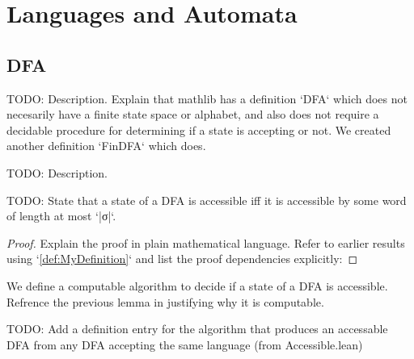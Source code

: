\chapter {Languages and Automata}

\section{DFA}


\begin{definition}
\label{def:DFA}
TODO: Description. Explain that mathlib has a definition `DFA` which does not necesarily 
have a finite state space or alphabet, and also does not require a decidable procedure for 
determining if a state is accepting or not. We created another definition `FinDFA` which does.
\leanok %
\end{definition}

\begin{definition}
\label{def:AccessibleDFA}
TODO: Description. 
\leanok 
\end{definition}

\begin{lemma}[TODO] \label{lem:MyLemma}
TODO: State that a state of a DFA is accessible iff it is accessible by some
word of length at most `|σ|`. 
\leanok
{} 
\end{lemma}

\begin{proof}
\leanok
Explain the proof in plain mathematical language.  Refer to earlier
results using `\ref{def:MyDefinition}` and list the proof dependencies
explicitly:
\end{proof}

\begin{definition}
\label{isAccessible}
We define a computable algorithm to decide if a state of a DFA is accessible. 
Refrence the previous lemma in justifying why it is computable. 
\leanok 
\end{definition}


TODO: Add a definition entry for the algorithm that produces an accessable DFA 
from any DFA accepting the same language (from Accessible.lean)

